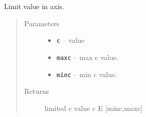 \documentclass[letterpaper,10pt,english]{sphinxmanual}
\begin{document}
\begin{fulllineitems}

\begin{fulllineitems}
\label{RRtoolbox.lib:RRtoolbox.lib.plotter.imtester.updatevisualization}
\end{fulllineitems}


\begin{fulllineitems}
\label{RRtoolbox.lib:RRtoolbox.lib.plotter.imtester.visualize}
\end{fulllineitems}


\begin{fulllineitems}
\label{RRtoolbox.lib:RRtoolbox.lib.plotter.imtester.windowfunc}
\end{fulllineitems}


\end{fulllineitems}


\begin{fulllineitems}
\label{RRtoolbox.lib:RRtoolbox.lib.plotter.limitaxis}
Limit value in axis.
\begin{quote}\begin{description}
\item[{Parameters}] \leavevmode\begin{itemize}
\item {} 
\textbf{\texttt{c}} -- value

\item {} 
\textbf{\texttt{maxc}} -- max c value.

\item {} 
\textbf{\texttt{minc}} -- min c value.

\end{itemize}

\item[{Returns}] \leavevmode
limited c value c E {[}minc,maxc{]}

\end{description}\end{quote}

\end{fulllineitems}
\end{document}
